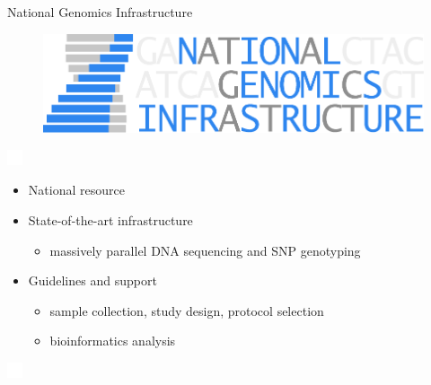 \documentclass[usepdftitle=false]{beamer}
\begin{document}

\begin{frame}{National Genomics Infrastructure}
	\begin{figure}
		\includegraphics[height=.7cm]{pictures/NGI}
	\end{figure}

	\includegraphics[height=.8cm]{pictures/blank}
	\begin{itemize}
		\item National resource
		\pause
		\item State-of-the-art infrastructure
		\begin{itemize}
			\item massively parallel DNA sequencing and SNP genotyping
		\end{itemize}
		\pause
		\item Guidelines and support
		\begin{itemize}
			\item sample collection, study design, protocol selection
			\item bioinformatics analysis
			\end{itemize}
	\end{itemize}
	\includegraphics[height=.8cm]{pictures/blank}

\end{frame}

\end{document}
